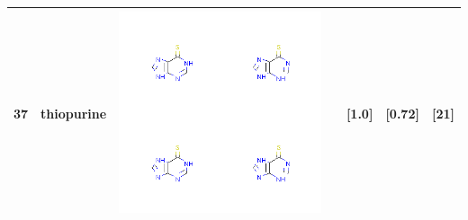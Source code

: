 \begin{longtable}{|l|l|l|l|l|l|l|}
\hline
37 & thiopurine & \includegraphics[scale=0.6]{thiopurineCA.png} & & [1.0]& [0.72] & [21] \\
\hline
\end{longtable}